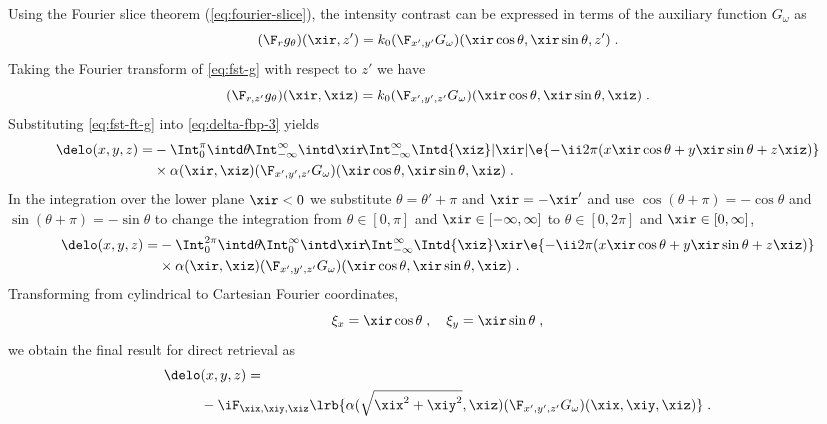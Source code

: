 \documentclass[
twoside,
openright,
titlepage,
numbers=noenddot,
headinclude,
fleqn,
a4paper,
footinclude=true,
cleardoublepage=empty,
abstractoff,
BCOR=5mm,
paper=a4,
fontsize=11pt,
british,ngerman,american,
]{scrreprt}
\begin{document}
Using the Fourier slice theorem (\cref{eq:fourier-slice}), the
intensity contrast can be expressed in terms of the auxiliary function
$G_\omega$ as
\begin{equation}
  \label{eq:fst-g}
  (\F_r g_\theta)(\xir,z') = k_0
  (\F_{x',y'}G_\omega)(\xir\cos\theta,\xir\sin\theta,z') \;.
\end{equation}
Taking the Fourier transform of \cref{eq:fst-g} with respect to $z'$
we have
\begin{equation}
  \label{eq:fst-ft-g}
  (\F_{r,z'}g_\theta)(\xir,\xiz) = k_0
  (\F_{x',y',z'}G_\omega)(\xir\cos\theta,\xir\sin\theta,\xiz) \;.
\end{equation}
Substituting \cref{eq:fst-ft-g} into \cref{eq:delta-fbp-3} yields
\begin{equation}
  \label{eq:delta-fbp-4}
  \begin{split}
    \delo(x,y,z)=&
     -\Int_0^{\pi}\intd\theta\!
    \Int_{-\infty}^\infty\intd\xir\!
    \Int_{-\infty}^\infty\Intd{\xiz} |\xir|
    \e{-\ii 2\pi(x\xir\cos\theta+y\xir\sin\theta+z\xiz)}    
    \\ & \times\alpha(\xir,\xiz)
    (\F_{x',y',z'}G_\omega)(\xir\cos\theta,\xir\sin\theta,\xiz) \;.
  \end{split}
\end{equation}
In the integration over the lower plane $\xir<0$ we substitute
$\theta=\theta'+\pi$ and $\xir=-\xir'$ and use
$\cos(\theta+\pi)=-\cos\theta$ and $\sin(\theta+\pi)=-\sin\theta$ to
change the integration from $\theta\in[0,\pi]$ and
$\xir\in[-\infty,\infty]$ to $\theta\in[0,2\pi]$ and
$\xir\in[0,\infty]$,
\begin{equation}
  \label{eq:delta-fbp-5}
  \begin{split}
    \delo(x,y,z)=&
     -\Int_0^{2\pi}\intd\theta\!
    \Int_0^\infty\intd\xir\!
    \Int_{-\infty}^\infty\Intd{\xiz} \xir
    \e{-\ii 2\pi(x\xir\cos\theta+y\xir\sin\theta+z\xiz)}    
    \\ & \times\alpha(\xir,\xiz)
    (\F_{x',y',z'}G_\omega)(\xir\cos\theta,\xir\sin\theta,\xiz) \;.
  \end{split}
\end{equation}
Transforming from cylindrical to Cartesian Fourier coordinates,
\begin{equation}
  \label{eq:cylindrical}
   \xi_x= \xir \cos\theta \;,\quad \xi_y = \xir \sin\theta \;,
\end{equation}
we obtain the final result for direct retrieval as
\begin{equation}
  \label{eq:direct-retrieval}
  \begin{split}
    \delo&(x,y,z) = 
    \\ &-\iF_{\xix,\xiy,\xiz}\lrb{
     \alpha(\sqrt{\xix^2+\xiy^2},\xiz)
    (\F_{x',y',z'}G_\omega)(\xix,\xiy,\xiz) } \;.
  \end{split}
\end{equation}
\end{document}
